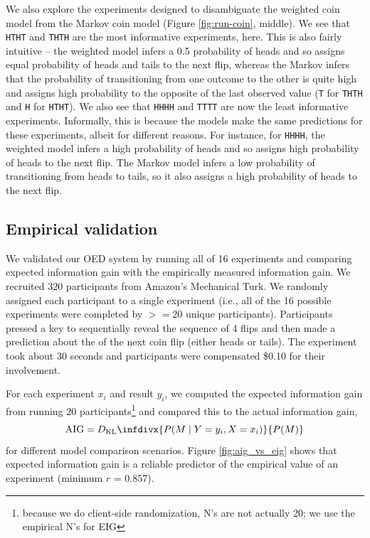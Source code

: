 \documentclass{article}
\newcommand{\dkl}{D_\mathrm{KL}\infdivx}
\begin{document}
We also explore the experiments designed to disambiguate the weighted coin model from the Markov coin model (Figure \ref{fig:run-coin}, middle).
We see that \lstinline{HTHT} and \lstinline{THTH} are the most informative experiments, here.
This is also fairly intuitive -- the weighted model infers a 0.5 probability of heads and so assigns equal probability of heads and tails to the next flip, whereas the Markov infers that the probability of transitioning from one outcome to the other is quite high and assigns high probability to the opposite of the last observed value (\lstinline{T} for \lstinline{THTH} and \lstinline{H} for \lstinline{HTHT}).
We also see that \lstinline{HHHH} and \lstinline{TTTT} are now the least informative experiments.
Informally, this is because the models make the same predictions for these experiments, albeit for different reasons.
For instance, for \lstinline{HHHH}, the weighted model infers a high probability of heads and so assigns high probability of heads to the next flip.
The Markov model infers a low probability of transitioning from heads to tails, so it also assigns a high probability of heads to the next flip.



\subsection{Empirical validation}
We validated our OED system by running all of 16 experiments and comparing expected information gain with the empirically measured information gain.
We recruited 320 participants from Amazon's Mechanical Turk.
We randomly assigned each participant to a single experiment (i.e., all of the 16 possible experiments were completed by $>=$20 unique participants).
Participants pressed a key to sequentially reveal the sequence of 4 flips and then made a prediction about the of the next coin flip (either heads or tails).
The experiment took about 30 seconds and participants were compensated \$0.10 for their involvement.

For each experiment $x_i$ and result $y_i$, we computed the expected information gain from running 20 participants\footnote{because we do client-side randomization, N's are not actually 20; we use the empirical N's for EIG} and compared this to the actual information gain,
$$\mathrm{AIG} = \dkl{P(M \mid Y = y_i, X = x_i)}{P(M)}$$
for different model comparison scenarios.
Figure \ref{fig:aig_vs_eig} shows that expected information gain is a reliable predictor of the empirical value of an experiment (minimum $r$ = 0.857).
\end{document}
